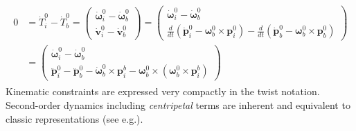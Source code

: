 \documentclass[a4paper,twoside, openright,12pt]{report}
\newcommand{\f}[1]{\boldsymbol{#1}}
\begin{document}
\begin{eqnarray}
\begin{aligned}
0 &= \dot{T}_i^0 - \dot{T}_b^0 = \begin{pmatrix}
\dot{\boldsymbol{\omega}}_i^0 - \dot{\boldsymbol{\omega}}_b^0 \\ \dot{\f{v}}_i^0 - \dot{\f{v}}_b^0
\end{pmatrix} =
\begin{pmatrix}
\dot{\boldsymbol{\omega}}_i^0 - \dot{\boldsymbol{\omega}}_b^0 \\ \frac{d}{dt}(\dot{\f{p}}_i^0 - \boldsymbol{\omega}_b^0 \times \f{p}_i^0) - \frac{d}{dt}(\dot{\f{p}}_b^0 - \boldsymbol{\omega}_b^0 \times \f{p}_b^0)
\end{pmatrix}\\
 &=
\begin{pmatrix}
\dot{\boldsymbol{\omega}}_i^0 - \dot{\boldsymbol{\omega}}_b^0 \\
\ddot{\f{p}}_i^0 - \ddot{\f{p}}_b^0 - \dot{\boldsymbol{\omega}}_b^0 \times \f{p}_i^b - \boldsymbol{\omega}_b^0 \times (\boldsymbol{\omega}_b^0 \times \f{p}_i^b)
\end{pmatrix}
\end{aligned}
\end{eqnarray}
Kinematic constraints are expressed very compactly in the twist notation. Second-order dynamics including \emph{centripetal} terms are inherent and equivalent to classic representations (see e.g.\cite{Erhart_16}).\\
\end{document}
